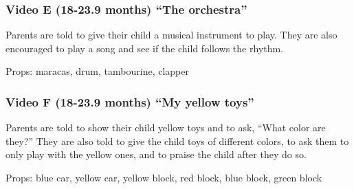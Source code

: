\documentclass[man,floatsintext]{apa6}
\begin{document}
\begin{appendix}
{\subsubsection{Video E (18-23.9 months) ``The
orchestra''}\label{video-e-18-23.9-months-the-orchestra}}

Parents are told to give their child a musical instrument to play. They
are also encouraged to play a song and see if the child follows the
rhythm.

Props: maracas, drum, tambourine, clapper

\hypertarget{video-f-18-23.9-months-my-yellow-toys}{%
\subsubsection{Video F (18-23.9 months) ``My yellow
toys''}\label{video-f-18-23.9-months-my-yellow-toys}}

Parents are told to show their child yellow toys and to ask, ``What
color are they?'' They are also told to give the child toys of different
colors, to ask them to only play with the yellow ones, and to praise the
child after they do so.

Props: blue car, yellow car, yellow block, red block, blue block, green
block
\end{appendix}
\end{document}
